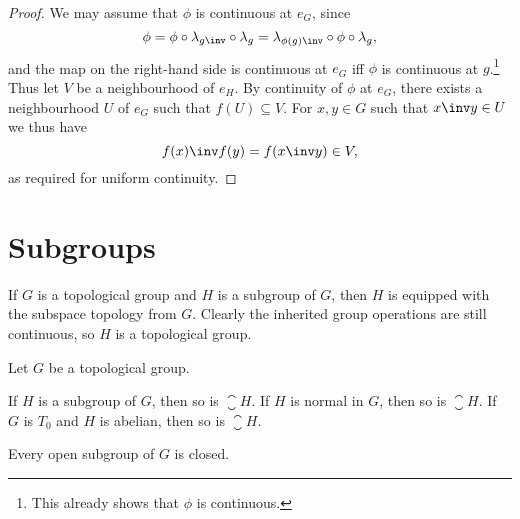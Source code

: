 \documentclass[article, a4paper, 11pt, oneside]{memoir}
\numberwithin{equation}{chapter}
\begin{document}
\begin{proof}
    We may assume that $\phi$ is continuous at $e_G$, since
    \begin{equation*}
        \phi
            = \phi \circ \leftmult_{g\inv} \circ \leftmult_{g}
            = \leftmult_{\phi(g)\inv} \circ \phi \circ \leftmult_{g},
    \end{equation*}
    and the map on the right-hand side is continuous at $e_G$ iff $\phi$ is continuous at $g$.\footnote{This already shows that $\phi$ is continuous.} Thus let $V$ be a neighbourhood of $e_H$. By continuity of $\phi$ at $e_G$, there exists a neighbourhood $U$ of $e_G$ such that $f(U) \subseteq V$. For $x,y \in G$ such that $x\inv y \in U$ we thus have
    \begin{equation*}
        f(x)\inv f(y)
            = f(x\inv y)
            \in V,
    \end{equation*}
    as required for uniform continuity.
\end{proof}


\section{Subgroups}

If $G$ is a topological group and $H$ is a subgroup of $G$, then $H$ is equipped with the subspace topology from $G$. Clearly the inherited group operations are still continuous, so $H$ is a topological group.

\begin{proposition}
    Let $G$ be a topological group.
    \begin{enumprop}
        \item \label{enum:closure_of_subgroup} If $H$ is a subgroup of $G$, then so is $\closure{H}$. If $H$ is normal in $G$, then so is $\closure{H}$. If $G$ is $T_0$ and $H$ is abelian, then so is $\closure{H}$.
        
        \item \label{enum:open_subgroup_is_closed} Every open subgroup of $G$ is closed.
    \end{enumprop}
\end{proposition}
\end{document}
